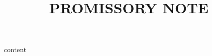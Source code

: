 \documentclass[12pt]{scrartcl}
\title{PROMISSORY NOTE}
\begin{document}
\maketitle
{content}
\end{document}
